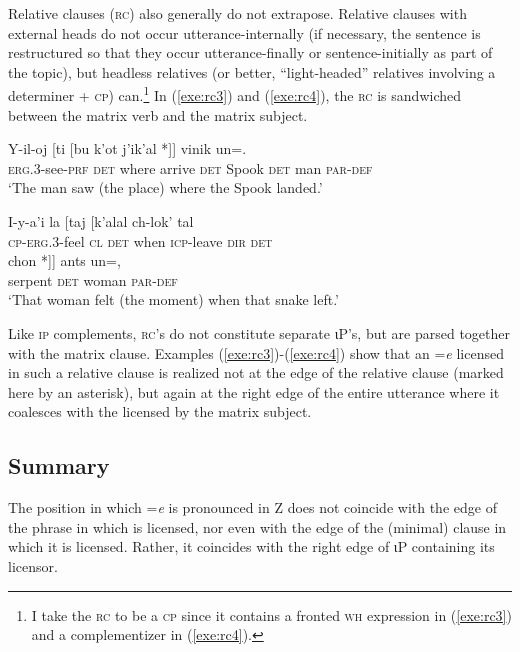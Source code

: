 \documentclass[output=paper,
modfonts
]{LSP/langsci}
\begin{document}
Relative clauses (\textsc{rc}) also generally do not extrapose. Relative clauses with external heads do not occur utterance-internally (if necessary, the sentence is restructured so that they occur utterance-finally or sentence-initially as part of the topic), but headless relatives (or better, ``light-headed'' relatives involving a determiner + \textsc{cp}) can.\footnote
{I take the \textsc{rc} to be a \textsc{cp} since it contains a fronted \textsc{wh} expression in (\ref{exe:rc3}) and a complementizer in (\ref{exe:rc4}).}
In (\ref{exe:rc3}) and (\ref{exe:rc4}), the \textsc{rc} is sandwiched between the matrix verb and the matrix subject. 
\begin{exe}
\ex\label{exe:rc3}\bridgeoverex
\gll Y-il-oj [ti [bu k'ot  j'ik'al *]]   vinik un=. \\
\textsc{erg.3}-see-\textsc{prf} \textsc{det} where arrive \textsc{det} Spook {} \textsc{det} man \textsc{par-def} \\
\glt `The man saw (the place) where the Spook landed.' \citep[63]{laughlin1977}
\end{exe}
\begin{exe}
\ex\label{exe:rc4}\bridgeoverex
\gll I-y-a'i la [taj [k'alal ch-lok' tal  \\
\textsc{cp-erg.3}-feel \textsc{cl} \textsc{det} when \textsc{icp}-leave \textsc{dir} \textsc{det} \\
\glt {\bridgeoverex}
\gll {\phantom{\hspace*{1in}}} chon *]]  ants un=, \\
{} serpent  {}  \textsc{det} woman \textsc{par-def} \\
\glt `That woman felt (the moment) when that snake left.'  \citep[371]{laughlin1977}
\end{exe}
Like \textsc{ip} complements, \textsc{rc}'s do not constitute separate ιP's, but are parsed together with the matrix clause.  
Examples (\ref{exe:rc3})-(\ref{exe:rc4}) show that an =\emph{e} licensed in such a relative clause is realized not at the edge of the relative clause (marked here by an asterisk), but again at the right edge of the entire utterance where it coalesces with the  licensed by the matrix subject.

\subsection{Summary}
The position in which =\emph{e} is pronounced in Z  does not coincide with the edge of the phrase in which is licensed, nor even 
with the edge of the (minimal) clause in which it is licensed. Rather, it  coincides with the right edge of ιP containing
its licensor.  
\end{document}
